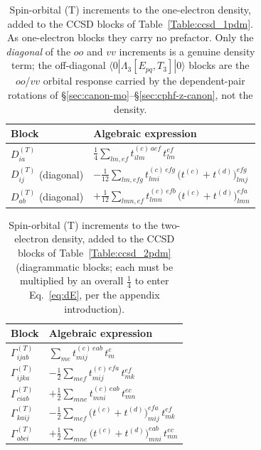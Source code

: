 \documentclass[12pt]{article}
\begin{document}
\begin{table}[H]
\caption{Spin-orbital (T) increments to the one-electron density, added to the
CCSD blocks of Table~\ref{Table:ccsd_1pdm}.  As one-electron blocks they carry no
prefactor.  Only the {\em diagonal} of the $oo$ and $vv$ increments is a genuine
density term; the off-diagonal $\langle 0|\Lambda_3[E_{pq},T_3]|0\rangle$ blocks
are the $oo$/$vv$ orbital response carried by the dependent-pair rotations of
\S\ref{sec:canon-mo}--\S\ref{sec:cphf-z-canon}, not the density.}
\label{Table:ccsdt_1pdm}
\renewcommand{\arraystretch}{1.6}
\begin{center}
\begin{tabular}{ll}
\hline\hline
Block & Algebraic expression \\
\hline
$D^{(T)}_{ia}$ & $\displaystyle \frac14 \sum_{lm,ef} t^{(c)\,aef}_{ilm}\, t^{ef}_{lm}$ \\
$D^{(T)}_{ij}$ (diagonal) & $\displaystyle -\frac{1}{12} \sum_{lm,efg} t^{(c)\,efg}_{lmi}\,\big(t^{(c)}+t^{(d)}\big)^{efg}_{lmj}$ \\
$D^{(T)}_{ab}$ (diagonal) & $\displaystyle +\frac{1}{12} \sum_{lmn,ef} t^{(c)\,efb}_{lmn}\,\big(t^{(c)}+t^{(d)}\big)^{efa}_{lmn}$ \\
\hline\hline
\end{tabular}
\end{center}
\end{table}

\begin{table}[H]
\caption{Spin-orbital (T) increments to the two-electron density, added to the
CCSD blocks of Table~\ref{Table:ccsd_2pdm} (diagrammatic blocks; each must be
multiplied by an overall $\frac14$ to enter Eq.~\eqref{eq:dE}, per the appendix
introduction).}
\label{Table:ccsdt_2pdm}
\renewcommand{\arraystretch}{1.6}
\begin{center}
\begin{tabular}{ll}
\hline\hline
Block & Algebraic expression \\
\hline
$\Gamma^{(T)}_{ijab}$ & $\displaystyle \sum_{me} t^{(c)\,eab}_{mij}\, t^e_m$ \\
$\Gamma^{(T)}_{ijka}$ & $\displaystyle -\frac12 \sum_{mef} t^{(c)\,efa}_{mij}\, t^{ef}_{mk}$ \\
$\Gamma^{(T)}_{ciab}$ & $\displaystyle +\frac12 \sum_{mne} t^{(c)\,eab}_{mni}\, t^{ec}_{mn}$ \\
$\Gamma^{(T)}_{kaij}$ & $\displaystyle -\frac12 \sum_{mef} \big(t^{(c)}+t^{(d)}\big)^{efa}_{mij}\, t^{ef}_{mk}$ \\
$\Gamma^{(T)}_{abci}$ & $\displaystyle +\frac12 \sum_{mne} \big(t^{(c)}+t^{(d)}\big)^{eab}_{mni}\, t^{ec}_{mn}$ \\
\hline\hline
\end{tabular}
\end{center}
\end{table}
\end{document}
